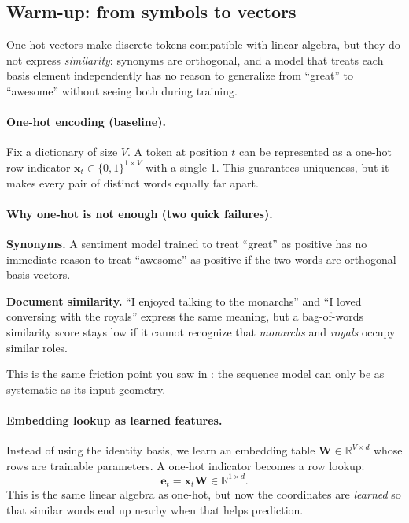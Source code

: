 \subsection{Warm-up: from symbols to vectors}
\label{sec:nlp_warmup_from_symbols_to_vectors}

One-hot vectors make discrete tokens compatible with linear algebra, but they do not express \emph{similarity}: synonyms are orthogonal, and a model that treats each basis element independently has no reason to generalize from ``great'' to ``awesome'' without seeing both during training.

\paragraph{One-hot encoding (baseline).}
Fix a dictionary of size \(V\). A token at position \(t\) can be represented as a one-hot row indicator \(\mathbf{x}_t \in \{0,1\}^{1\times V}\) with a single 1. This guarantees uniqueness, but it makes every pair of distinct words equally far apart.

\paragraph{Why one-hot is not enough (two quick failures).}
\textbf{Synonyms.} A sentiment model trained to treat ``great'' as positive has no immediate reason to treat ``awesome'' as positive if the two words are orthogonal basis vectors.\par
\textbf{Document similarity.} ``I enjoyed talking to the monarchs'' and ``I loved conversing with the royals'' express the same meaning, but a bag-of-words similarity score stays low if it cannot recognize that \emph{monarchs} and \emph{royals} occupy similar roles.

\medskip
\noindent This is the same friction point you saw in : the sequence model can only be as systematic as its input geometry.

\paragraph{Embedding lookup as learned features.}
Instead of using the identity basis, we learn an embedding table \(\mathbf{W}\in\mathbb{R}^{V\times d}\) whose rows are trainable parameters. A one-hot indicator becomes a row lookup:
\[
\mathbf{e}_t=\mathbf{x}_t\mathbf{W}\in\mathbb{R}^{1\times d}.
\]
This is the same linear algebra as one-hot, but now the coordinates are \emph{learned} so that similar words end up nearby when that helps prediction.

